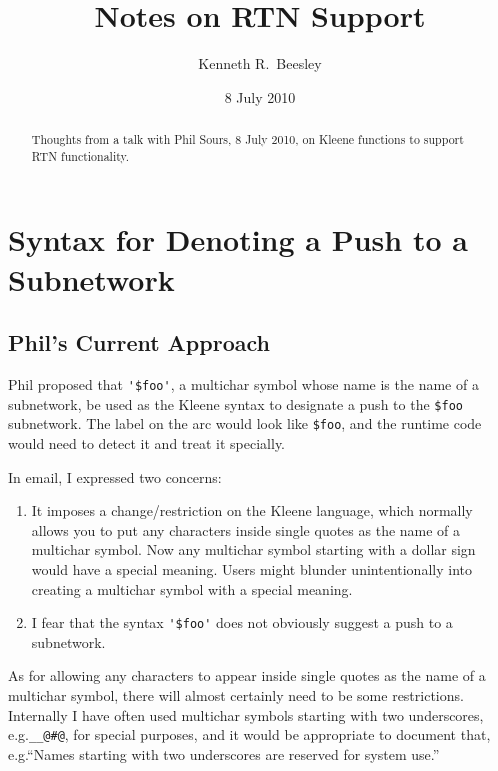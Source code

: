 \documentclass[letterpaper,12pt]{article}
\title{Notes on RTN Support}
\author{Kenneth R.~Beesley}
\date{8 July 2010}
\begin{document}
\maketitle


\begin{abstract}
Thoughts from a talk with Phil Sours, 8 July 2010, on Kleene functions to
support RTN functionality.
\end{abstract}

\section{Syntax for Denoting a Push to a Subnetwork}

\subsection{Phil's Current Approach}

Phil proposed that \verb!'$foo'!, a multichar symbol whose name is the name
of a subnetwork, be used as the Kleene syntax to designate a push to the
\verb!$foo! subnetwork.  The label on the arc would look like \verb!$foo!,
and the runtime code would need to detect it and treat it specially.

In email, I expressed two concerns:

\begin{enumerate}
\item
It imposes a change/restriction on the Kleene language, which normally
allows you to put any characters inside single quotes as the name of a
multichar symbol.  Now any multichar symbol starting with a dollar sign
would have a special meaning.  Users might blunder unintentionally into
creating a multichar symbol with a special meaning.

\item
I fear that the syntax \verb!'$foo'! does not obviously suggest a push to a
subnetwork.
\end{enumerate}

As for allowing any characters to appear inside single quotes as the name
of a multichar symbol, there will almost certainly need to be some
restrictions.  Internally I have often used multichar symbols starting with two
underscores, e.g.\@ \verb!__@#@!, for special purposes, and it would be appropriate to document
that, e.g.\@ ``Names starting with two underscores are reserved for system use.''
\end{document}
